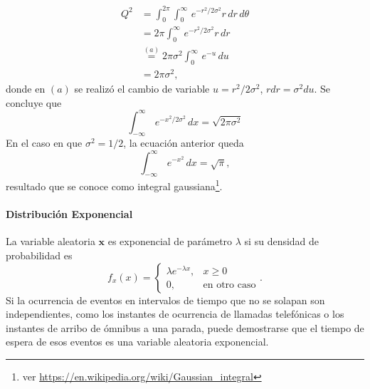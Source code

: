 \documentclass[a4paper]{report}
\newcommand{\x}{\mathbf{x}}
\begin{document}
\begin{align*}
 Q^2&=\int_{0}^{2\pi}\int_{0}^{\infty}\,e^{-r^2/2\sigma^2}r\,dr\,d\theta\\
    &=2\pi\int_{0}^{\infty}\,e^{-r^2/2\sigma^2}r\,dr\\
    &\overset{(a)}{=}2\pi\sigma^2\int_{0}^{\infty}\,e^{-u}\,du\\
    &=2\pi\sigma^2,
\end{align*}
donde en \((a)\) se realizó el cambio de variable \(u=r^2/2\sigma^2\), \(rdr=\sigma^2du\). Se concluye que
\begin{equation}\label{eq:random_gaussian_integral_with_sigma}
  \int_{-\infty}^{\infty}\,e^{-x^2/2\sigma^2}\,dx = \sqrt{2\pi\sigma^2}
\end{equation}
En el caso en que \(\sigma^2=1/2\), la ecuación anterior queda
\begin{equation}\label{eq:random_gaussian_integral}
 \int_{-\infty}^{\infty}\,e^{-x^2}\,dx = \sqrt{\pi},
\end{equation}
resultado que se conoce como integral gaussiana\footnote{ver \url{https://en.wikipedia.org/wiki/Gaussian_integral}}.

\paragraph{Distribución Exponencial}

La variable aleatoria \(\x\) es exponencial de parámetro \(\lambda\) si su densidad de probabilidad es
\begin{equation}\label{eq:pdf_exponential}
 f_x(x)=
 \left\{\begin{array}{ll}
  \lambda e^{-\lambda x}, & x\geq 0 \\
  0, & \textrm{en otro caso}
 \end{array}. \right.
\end{equation}
Si la ocurrencia de eventos en intervalos de tiempo que no se solapan son independientes, como los instantes de ocurrencia de llamadas telefónicas o los instantes de arribo de ómnibus a una parada, puede demostrarse que el tiempo de espera de esos eventos es una variable aleatoria exponencial. 
\end{document}

